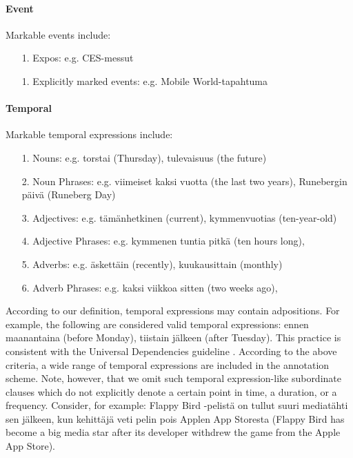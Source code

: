 \documentclass[11pt]{article}
\begin{document}
\paragraph{Event}

Markable events include:

\begin{itemize}

\item[1.] Expos: e.g. CES-messut
\item[1.] Explicitly marked events: e.g. Mobile World-tapahtuma

\end{itemize}


\paragraph{Temporal} Markable temporal expressions include:

\begin{itemize}

\item[1.] Nouns: e.g. torstai (Thursday), tulevaisuus (the future)
\item[2.] Noun Phrases: e.g. viimeiset kaksi vuotta (the last two years),  Runebergin p\"aiv\"a (Runeberg Day)
\item[3.] Adjectives: e.g. t\"am\"anhetkinen (current), kymmenvuotias (ten-year-old) 
\item[4.] Adjective Phrases: e.g. kymmenen tuntia pitk\"a (ten hours long), 
\item[5.] Adverbs: e.g. \"askett\"ain (recently), kuukausittain (monthly)
\item[6.] Adverb Phrases: e.g. kaksi viikkoa sitten (two weeks ago),

\end{itemize}

According to our definition, temporal expressions may contain adpositions. For example, the following are considered valid temporal expressions: ennen maanantaina (before Monday), tiistain j\"alkeen (after Tuesday). This practice is consistent with the Universal Dependencies guideline \cite{}. According to the above criteria, a wide range of temporal expressions are included in the annotation scheme. Note, however, that we omit such temporal expression-like subordinate clauses which do not explicitly denote a certain point in time, a duration, or a frequency. Consider, for example: Flappy  Bird -pelist\"a on tullut suuri mediat\"ahti sen j\"alkeen, kun kehitt\"aj\"a veti pelin pois Applen App Storesta (Flappy Bird has become a big media star after its developer withdrew the game from the Apple App Store).
\end{document}
